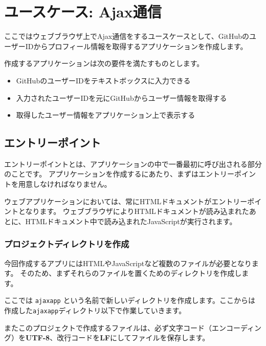 \hypertarget{usecase-ajax}{%
\chapter{ユースケース: Ajax通信}\label{usecase-ajax}}
\thispagestyle{frontheadings}

ここではウェブブラウザ上でAjax通信をするユースケースとして、GitHubのユーザーIDからプロフィール情報を取得するアプリケーションを作成します。

作成するアプリケーションは次の要件を満たすものとします。

\begin{itemize}
\item
  GitHubのユーザーIDをテキストボックスに入力できる
\item
  入力されたユーザーIDを元にGitHubからユーザー情報を取得する
\item
  取得したユーザー情報をアプリケーション上で表示する
\end{itemize}

\hypertarget{entrypoint}{%
\section{エントリーポイント}\label{entrypoint}}

エントリーポイントとは、アプリケーションの中で一番最初に呼び出される部分のことです。
アプリケーションを作成するにあたり、まずはエントリーポイントを用意しなければなりません。

ウェブアプリケーションにおいては、常にHTMLドキュメントがエントリーポイントとなります。
ウェブブラウザによりHTMLドキュメントが読み込まれたあとに、HTMLドキュメント中で読み込まれたJavaScriptが実行されます。

\hypertarget{create-project-directory}{%
\subsection{プロジェクトディレクトリを作成}\label{create-project-directory}}

今回作成するアプリにはHTMLやJavaScriptなど複数のファイルが必要となります。
そのため、まずそれらのファイルを置くためのディレクトリを作成します。

ここでは \texttt{ajaxapp}
という名前で新しいディレクトリを作成します。ここからは作成した\texttt{ajaxapp}ディレクトリ以下で作業していきます。

またこのプロジェクトで作成するファイルは、必ず文字コード（エンコーディング）を\textbf{UTF-8}、改行コードを\textbf{LF}にしてファイルを保存します。

